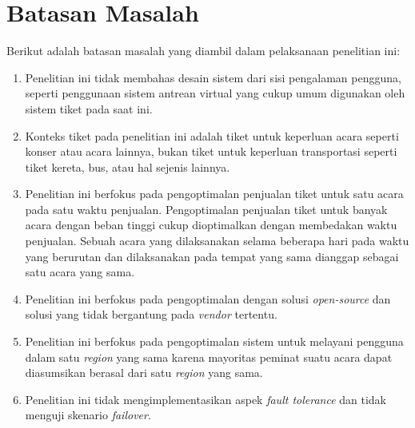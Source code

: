 \section{Batasan Masalah}
\label{sec:batasan-masalah}

Berikut adalah batasan masalah yang diambil dalam pelaksanaan penelitian ini:

\begin{enumerate}
  \item Penelitian ini tidak membahas desain sistem dari sisi pengalaman pengguna, seperti penggunaan sistem antrean virtual yang cukup umum digunakan oleh sistem tiket pada saat ini.
  \item Konteks tiket pada penelitian ini adalah tiket untuk keperluan acara seperti konser atau acara lainnya, bukan tiket untuk keperluan transportasi seperti tiket kereta, bus, atau hal sejenis lainnya.
  \item Penelitian ini berfokus pada pengoptimalan penjualan tiket untuk satu acara pada satu waktu penjualan. Pengoptimalan penjualan tiket untuk banyak acara dengan beban tinggi cukup dioptimalkan dengan membedakan waktu penjualan. Sebuah acara yang dilaksanakan selama beberapa hari pada waktu yang berurutan dan dilaksanakan pada tempat yang sama dianggap sebagai satu acara yang sama.
  \item Penelitian ini berfokus pada pengoptimalan dengan solusi \textit{open-source} dan solusi yang tidak bergantung pada \textit{vendor} tertentu.
  \item Penelitian ini berfokus pada pengoptimalan sistem untuk melayani pengguna dalam satu \textit{region} yang sama karena mayoritas peminat suatu acara dapat diasumsikan berasal dari satu \textit{region} yang sama.
  \item Penelitian ini tidak mengimplementasikan aspek \textit{fault tolerance} dan tidak menguji skenario \textit{failover}.
\end{enumerate}

